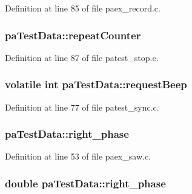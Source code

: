 Definition at line 85 of file paex\+\_\+record.\+c.

\subsubsection[{\texorpdfstring{repeat\+Counter}{repeatCounter}}]{ pa\+Test\+Data\+::repeat\+Counter}\hypertarget{structpa_test_data_a1946a596775fec684a3e31b2634f9b23}{}\label{structpa_test_data_a1946a596775fec684a3e31b2634f9b23}


Definition at line 87 of file patest\+\_\+stop.\+c.

\subsubsection[{\texorpdfstring{request\+Beep}{requestBeep}}]{\setlength{\rightskip}{0pt plus 5cm}volatile {\bf int} pa\+Test\+Data\+::request\+Beep}\hypertarget{structpa_test_data_a04b470bef71b5f6ef5bb30565c462f83}{}\label{structpa_test_data_a04b470bef71b5f6ef5bb30565c462f83}


Definition at line 77 of file patest\+\_\+sync.\+c.

\subsubsection[{\texorpdfstring{right\+\_\+phase}{right_phase}}]{ pa\+Test\+Data\+::right\+\_\+phase}\hypertarget{structpa_test_data_ac76fb867d4b48bfea1554ad15b5dcf64}{}\label{structpa_test_data_ac76fb867d4b48bfea1554ad15b5dcf64}


Definition at line 53 of file paex\+\_\+saw.\+c.

\subsubsection[{\texorpdfstring{right\+\_\+phase}{right_phase}}]{\setlength{\rightskip}{0pt plus 5cm}double pa\+Test\+Data\+::right\+\_\+phase}\hypertarget{structpa_test_data_acb76ae49b8bcc375f036e491bd24fc8a}{}\label{structpa_test_data_acb76ae49b8bcc375f036e491bd24fc8a}


